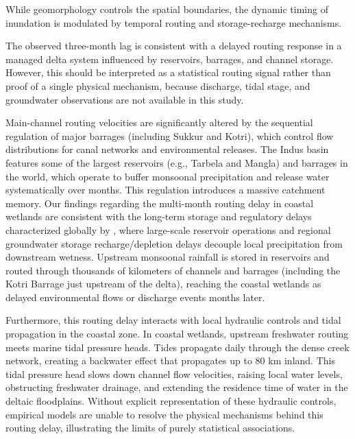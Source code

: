 While geomorphology controls the spatial boundaries, the dynamic timing of inundation is modulated by temporal routing and storage-recharge mechanisms.

The observed three-month lag is consistent with a delayed routing response in a managed delta system influenced by reservoirs, barrages, and channel storage. However, this should be interpreted as a statistical routing signal rather than proof of a single physical mechanism, because discharge, tidal stage, and groundwater observations are not available in this study.

Main-channel routing velocities are significantly altered by the sequential regulation of major barrages (including Sukkur and Kotri), which control flow distributions for canal networks and environmental releases. The Indus basin features some of the largest reservoirs (e.g., Tarbela and Mangla) and barrages in the world, which operate to buffer monsoonal precipitation and release water systematically over months. This regulation introduces a massive catchment memory. Our findings regarding the multi-month routing delay in coastal wetlands are consistent with the long-term storage and regulatory delays characterized globally by \citet{Scanlon2023Global}, where large-scale reservoir operations and regional groundwater storage recharge/depletion delays decouple local precipitation from downstream wetness. Upstream monsoonal rainfall is stored in reservoirs and routed through thousands of kilometers of channels and barrages (including the Kotri Barrage just upstream of the delta), reaching the coastal wetlands as delayed environmental flows or discharge events months later.

Furthermore, this routing delay interacts with local hydraulic controls and tidal propagation in the coastal zone. In coastal wetlands, upstream freshwater routing meets marine tidal pressure heads. Tides propagate daily through the dense creek network, creating a backwater effect that propagates up to 80 km inland. This tidal pressure head slows down channel flow velocities, raising local water levels, obstructing freshwater drainage, and extending the residence time of water in the deltaic floodplains. Without explicit representation of these hydraulic controls, empirical models are unable to resolve the physical mechanisms behind this routing delay, illustrating the limits of purely statistical associations.

